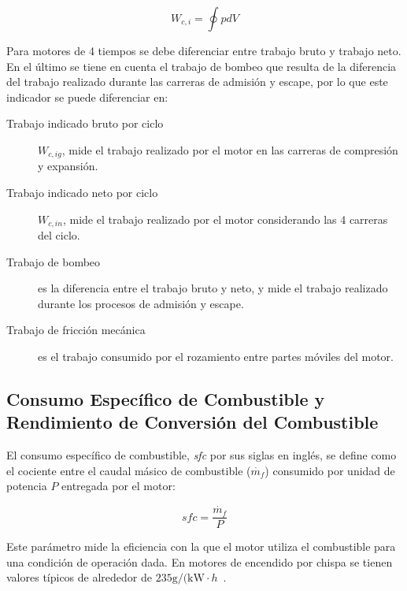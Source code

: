 \begin{equation}\label{eq:w_indicado}
  W_{c,i} = \oint p dV
\end{equation}

Para motores de 4 tiempos se debe diferenciar entre trabajo bruto y trabajo neto.
%
En el último se tiene en cuenta el trabajo de bombeo que resulta de la
diferencia del trabajo realizado durante las carreras de admisión y escape, por
lo que este indicador se puede diferenciar en:
%
\begin{description}
  \item [Trabajo indicado bruto por ciclo] $W_{c,ig}$, mide el trabajo realizado
por el motor en las carreras de compresión y expansión.
  \item [Trabajo indicado neto por ciclo] $W_{c,in}$, mide el trabajo realizado
por el motor considerando las 4 carreras del ciclo.
  \item [Trabajo de bombeo] es la diferencia entre el trabajo bruto y neto, y
mide el trabajo realizado durante los procesos de admisión y escape.
  \item [Trabajo de fricción mecánica] es el trabajo consumido por el rozamiento
entre partes móviles del motor.
\end{description}


\subsection{Consumo Específico de Combustible y Rendimiento de Conversión del
Combustible}
%
El consumo específico de combustible, \emph{sfc} por sus siglas en inglés, se
define como el cociente entre el caudal másico de combustible ($\dot{m_f}$)
consumido por unidad de potencia $P$ entregada por el motor:

\begin{equation}\label{eq:sfc} sfc = \frac{\dot{m_f}}{P}
\end{equation}

Este parámetro mide la eficiencia con la que el motor utiliza el combustible
para una condición de operación dada.
%
En motores de encendido por chispa se tienen valores típicos de alrededor de
$235\text{g/(kW}\cdot h$~\parencite{heywood}.

